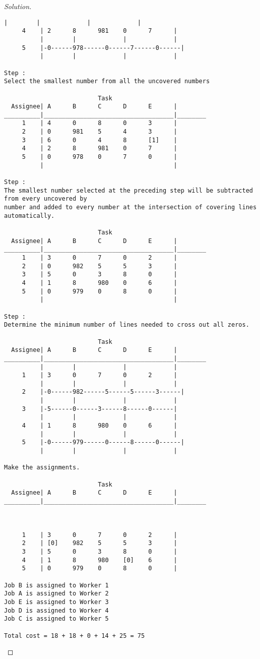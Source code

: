 \documentclass[titlepage, letterpaper, fleqn]{article}
\renewcommand\qedsymbol{\(\blacksquare\)}
\newenvironment{solution}
{\renewcommand\qedsymbol{$\square$}\begin{proof}[Solution]}
{\end{proof}}
\begin{document}
\begin{solution}
\begin{lstlisting}[basicstyle=\tiny]
          |        |             |             |
     4    | 2      8      981    0      7      |
          |        |             |             |
     5    |-0------978------0------7------0------|
          |        |             |             |

Step :
Select the smallest number from all the uncovered numbers

                          Task
  Assignee| A      B      C      D      E      |
__________|____________________________________|________
     1    | 4      0      8      0      3      | 
     2    | 0      981    5      4      3      | 
     3    | 6      0      4      8      [1]    | 
     4    | 2      8      981    0      7      | 
     5    | 0      978    0      7      0      | 
          |                                    | 

Step :
The smallest number selected at the preceding step will be subtracted from every uncovered by 
number and added to every number at the intersection of covering lines automatically. 

                          Task
  Assignee| A      B      C      D      E      |
__________|____________________________________|________
     1    | 3      0      7      0      2      | 
     2    | 0      982    5      5      3      | 
     3    | 5      0      3      8      0      | 
     4    | 1      8      980    0      6      | 
     5    | 0      979    0      8      0      | 
          |                                    | 

Step :
Determine the minimum number of lines needed to cross out all zeros.

                          Task
  Assignee| A      B      C      D      E      |
__________|____________________________________|________
          |        |             |             |
     1    | 3      0      7      0      2      |
          |        |             |             |
     2    |-0------982------5------5------3------|
          |        |             |             |
     3    |-5------0------3------8------0------|
          |        |             |             |
     4    | 1      8      980    0      6      |
          |        |             |             |
     5    |-0------979------0------8------0------|
          |        |             |             |

Make the assignments.

                          Task
  Assignee| A      B      C      D      E      |
__________|____________________________________|________



     1    | 3      0      7      0      2      | 
     2    | [0]    982    5      5      3      | 
     3    | 5      0      3      8      0      | 
     4    | 1      8      980    [0]    6      | 
     5    | 0      979    0      8      0      | 

Job B is assigned to Worker 1
Job A is assigned to Worker 2
Job E is assigned to Worker 3
Job D is assigned to Worker 4
Job C is assigned to Worker 5

Total cost = 18 + 18 + 0 + 14 + 25 = 75
\end{lstlisting}
\end{solution}
\end{document}
